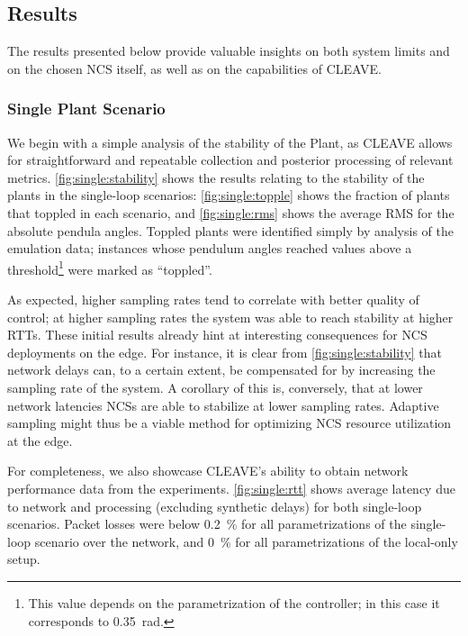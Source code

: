 \subsection{Results}\label{ssec:results}

The results presented below provide valuable insights on both system limits and on the chosen \ac{NCS} itself, as well as on the capabilities of \ac{CLEAVE}.

\subsubsection{Single Plant Scenario}

We begin with a simple analysis of the stability of the Plant, as \ac{CLEAVE} allows for straightforward and repeatable collection and posterior processing of relevant metrics.  
\cref{fig:single:stability} shows the results relating to the stability of the plants in the single-loop scenarios:
\cref{fig:single:topple} shows the fraction of plants that toppled in each scenario, and \cref{fig:single:rms} shows the average \ac{RMS} for the absolute pendula angles.
Toppled plants were identified simply by analysis of the emulation data; instances whose pendulum angles reached values above a threshold\footnote{This value depends on the parametrization of the controller; in this case it corresponds to \SI{0.35}{\radian}.} were marked as ``toppled''.

As expected, higher sampling rates tend to correlate with better quality of control; at higher sampling rates the system was able to reach stability at higher \acp{RTT}.
These initial results already hint at interesting consequences for \ac{NCS} deployments on the edge.
For instance, it is clear from \cref{fig:single:stability} that network delays can, to a certain extent, be compensated for by increasing the sampling rate of the system.
A corollary of this is, conversely, that at lower network latencies \acp{NCS} are able to stabilize at lower sampling rates.
Adaptive sampling might thus be a viable method for optimizing \ac{NCS} resource utilization at the edge.

For completeness, we also showcase \ac{CLEAVE}'s ability to obtain network performance data from the experiments.
\cref{fig:single:rtt} shows average latency due to network and processing (excluding synthetic delays) for both single-loop scenarios.
Packet losses were below \SI{0.2}{\percent} for all parametrizations of the single-loop scenario over the network, and \SI{0}{\percent} for all parametrizations of the local-only setup.

